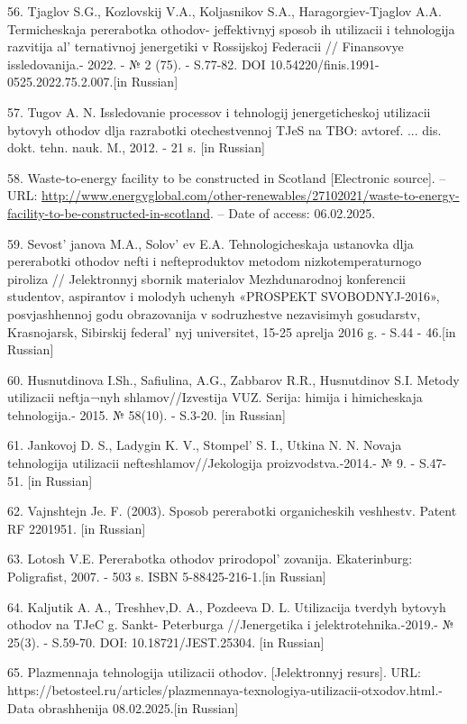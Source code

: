 56. Tjaglov S.G., Kozlovskij V.A., Koljasnikov S.A., Haragorgiev-Tjaglov
A.A. Termicheskaja pererabotka othodov- jeffektivnyj sposob ih
utilizacii i tehnologija razvitija al' ternativnoj
jenergetiki v Rossijskoj Federacii // Finansovye issledovanija.- 2022. -
№ 2 (75). - S.77-82. DOI 10.54220/finis.1991-0525.2022.75.2.007.{[}in
Russian{]}

57. Tugov A. N. Issledovanie processov i tehnologij jenergeticheskoj
utilizacii bytovyh othodov dlja razrabotki otechestvennoj TJeS na TBO:
avtoref. ... dis. dokt. tehn. nauk. M., 2012. - 21 s. {[}in Russian{]}

58. Waste-to-energy facility to be constructed in Scotland {[}Electronic
source{]}. -- URL:
\url{http://www.energyglobal.com/other-renewables/27102021/waste-to-energy-facility-to-be-constructed-in-scotland}.
-- Date of access: 06.02.2025.

59. Sevost' janova M.A., Solov' ev E.A.
Tehnologicheskaja ustanovka dlja pererabotki othodov nefti i
nefteproduktov metodom nizkotemperaturnogo piroliza // Jelektronnyj
sbornik materialov Mezhdunarodnoj konferencii studentov, aspirantov i
molodyh uchenyh «PROSPEKT SVOBODNYJ-2016», posvjashhennoj godu
obrazovanija v sodruzhestve nezavisimyh gosudarstv, Krasnojarsk,
Sibirskij federal' nyj universitet, 15-25 aprelja 2016 g.
- S.44 - 46.{[}in Russian{]}

60. Husnutdinova I.Sh., Safiulina, A.G., Zabbarov R.R., Husnutdinov S.I.
Metody utilizacii neftja¬nyh shlamov//Izvestija VUZ. Serija: himija i
himicheskaja tehnologija.- 2015. № 58(10). - S.3-20. {[}in Russian{]}

61. Jankovoj D. S., Ladygin K. V., Stompel'{} S. I.,
Utkina N. N. Novaja tehnologija utilizacii nefteshlamov//Jekologija
proizvodstva.-2014.- № 9. - S.47-51. {[}in Russian{]}

62. Vajnshtejn Je. F. (2003). Sposob pererabotki organicheskih
veshhestv. Patent RF 2201951. {[}in Russian{]}

63. Lotosh V.E. Pererabotka othodov prirodopol' zovanija.
Ekaterinburg: Poligrafist, 2007. - 503 s. ISBN 5-88425-216-1.{[}in
Russian{]}

64. Kaljutik A. A., Treshhev,D. A., Pozdeeva D. L. Utilizacija tverdyh
bytovyh othodov na TJeC g. Sankt- Peterburga //Jenergetika i
jelektrotehnika.-2019.- № 25(3). - S.59-70. DOI: 10.18721/JEST.25304.
{[}in Russian{]}

65. Plazmennaja tehnologija utilizacii othodov. {[}Jelektronnyj
resurs{]}. URL:
https://betosteel.ru/articles/plazmennaya-texnologiya-utilizacii-otxodov.html.-
Data obrashhenija 08.02.2025.{[}in Russian{]}

